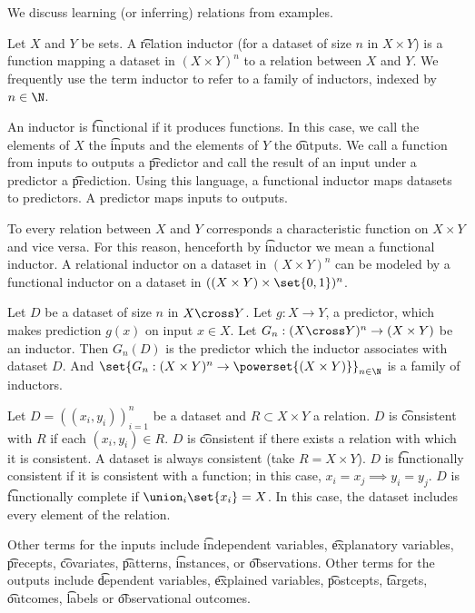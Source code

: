 
We discuss learning (or inferring) relations from examples.


Let $X$ and $Y$ be sets.
A \t{relation inductor} (for a dataset of size $n$ in $X \times Y$) is a function mapping a dataset in $(X \times Y)^n$ to a relation between $X$ and $Y$.
We frequently use the term inductor to refer to a family of inductors, indexed by $n \in \N$.

An inductor is \t{functional} if it produces functions.
In this case, we call the elements of $X$ the \t{inputs} and the elements of $Y$ the \t{outputs}.
We call a function from inputs to outputs a \t{predictor} and call the result of an input under a predictor a \t{prediction}.
Using this language, a functional inductor maps datasets to predictors.
A predictor maps inputs to outputs.

To every relation between $X$ and $Y$ corresponds a characteristic function on $X \times Y$ and vice versa.
For this reason, henceforth by \t{inductor} we mean a functional inductor.
A relational inductor on a dataset in $(X \times Y)^n$ can be modeled by a functional inductor on a dataset in $((X \times Y) \times \set{0, 1})^n$.


Let $D$ be a dataset of size $n$ in $X \cross Y$.
Let $g: X \to Y$, a predictor, which makes prediction $g(x)$ on input $x \in X$.
Let $G_n: (X \cross Y)^n \to (X \times Y)$ be an inductor.
Then $G_n(D)$ is the predictor which the inductor associates with dataset $D$.
And $\set{G_n: (X \times Y)^n \to \powerset{(X \times Y)}}_{n \in \N}$ is a family of inductors.


Let $D = ((x_i, y_i))_{i =1}^{n}$ be a dataset and $R \subset X \times Y$ a relation.
$D$ is \t{consistent with $R$} if each $(x_i, y_i) \in R$.
$D$ is \t{consistent} if there exists a relation with which it is consistent.
A dataset is always consistent (take $R = X \times Y$).
$D$ is \t{functionally consistent} if it is consistent with a function; in this case, $x_i = x_j \implies y_i = y_j$.
$D$ is \t{functionally complete} if $\union_i\set{x_i} = X$.
In this case, the dataset includes every element of the relation.


Other terms for the inputs include \t{independent variables}, \t{explanatory variables}, \t{precepts}, \t{covariates}, \t{patterns}, \t{instances}, or \t{observations}.
Other terms for the outputs include \t{dependent variables}, \t{explained variables}, \t{postcepts}, \t{targets}, \t{outcomes}, \t{labels} or \t{observational outcomes}.


